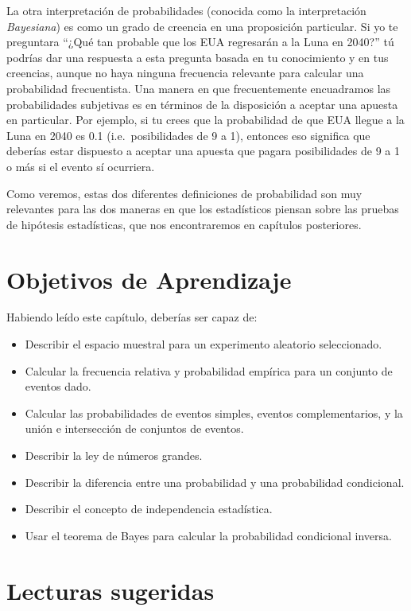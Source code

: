 \documentclass[
  12pt,
]{book}
\providecommand{\tightlist}{%
  \setlength{\itemsep}{0pt}\setlength{\parskip}{0pt}}
\begin{document}
La otra interpretación de probabilidades (conocida como la interpretación \emph{Bayesiana}) es como un grado de creencia en una proposición particular. Si yo te preguntara ``¿Qué tan probable que los EUA regresarán a la Luna en 2040?'' tú podrías dar una respuesta a esta pregunta basada en tu conocimiento y en tus creencias, aunque no haya ninguna frecuencia relevante para calcular una probabilidad frecuentista. Una manera en que frecuentemente encuadramos las probabilidades subjetivas es en términos de la disposición a aceptar una apuesta en particular. Por ejemplo, si tu crees que la probabilidad de que EUA llegue a la Luna en 2040 es 0.1 (i.e.~posibilidades de 9 a 1), entonces eso significa que deberías estar dispuesto a aceptar una apuesta que pagara posibilidades de 9 a 1 o más si el evento sí ocurriera.

Como veremos, estas dos diferentes definiciones de probabilidad son muy relevantes para las dos maneras en que los estadísticos piensan sobre las pruebas de hipótesis estadísticas, que nos encontraremos en capítulos posteriores.

\hypertarget{objetivos-de-aprendizaje-5}{%
\section{Objetivos de Aprendizaje}\label{objetivos-de-aprendizaje-5}}

Habiendo leído este capítulo, deberías ser capaz de:

\begin{itemize}
\tightlist
\item
  Describir el espacio muestral para un experimento aleatorio seleccionado.
\item
  Calcular la frecuencia relativa y probabilidad empírica para un conjunto de eventos dado.
\item
  Calcular las probabilidades de eventos simples, eventos complementarios, y la unión e intersección de conjuntos de eventos.
\item
  Describir la ley de números grandes.
\item
  Describir la diferencia entre una probabilidad y una probabilidad condicional.
\item
  Describir el concepto de independencia estadística.
\item
  Usar el teorema de Bayes para calcular la probabilidad condicional inversa.
\end{itemize}

\hypertarget{lecturas-sugeridas-3}{%
\section{Lecturas sugeridas}\label{lecturas-sugeridas-3}}
\end{document}
